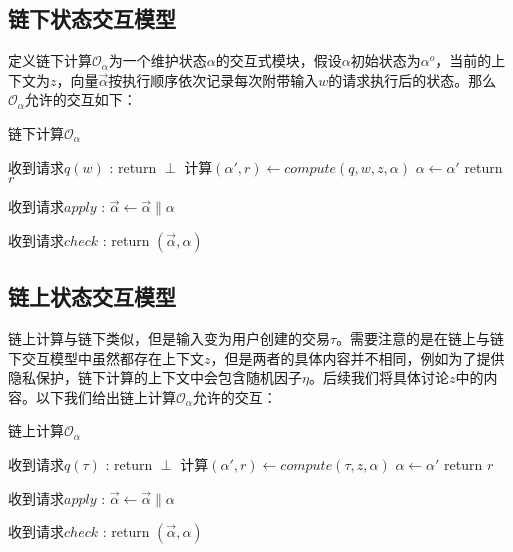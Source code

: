 \subsection{链下状态交互模型}
定义链下计算$\mathcal{O}_{\alpha}$为一个维护状态$\alpha$的交互式模块，假设$\alpha$初始状态为$\alpha^o$，当前的上下文为$z$，向量$\vec{\alpha}$按执行顺序依次记录每次附带输入$w$的请求执行后的状态。那么$\mathcal{O}_{\alpha}$允许的交互如下：

\begin{breakablealgorithm}
    \caption{链下计算$\mathcal{O}_{\alpha}$}
    \label{alg:ch3-1}
    \begin{algorithmic} 
    \item [收到请求$q(w)$]:
    \IF {$\alpha = \perp$} 
    \STATE return $\perp$
    \ENDIF
    \STATE 计算$(\alpha', r) \leftarrow compute(q, w, z, \alpha)$
    \STATE $\alpha \leftarrow \alpha'$
    \STATE return $r$
    \item [收到请求$apply$]:
    \STATE $\vec{\alpha} \leftarrow \vec{\alpha} \parallel \alpha$
    \item [收到请求$check$]:
    \STATE return $(\vec{\alpha}, \alpha)$
    \end{algorithmic}
\end{breakablealgorithm}

\subsection{链上状态交互模型}
链上计算与链下类似，但是输入变为用户创建的交易$\tau$。需要注意的是在链上与链下交互模型中虽然都存在上下文$z$，但是两者的具体内容并不相同，例如为了提供隐私保护，链下计算的上下文中会包含随机因子$\eta$。后续我们将具体讨论$z$中的内容。以下我们给出链上计算$\mathcal{O}_{\alpha}$允许的交互：

\begin{breakablealgorithm}
    \caption{链上计算$\mathcal{O}_{\alpha}$}
    \label{alg:ch3-2}
    \begin{algorithmic} 
        \setlength{\itemsep}{0pt}
        \setlength{\parsep}{0pt}
        \setlength{\parskip}{0pt}
        \item [收到请求$q(\tau)$]:
        \IF {$\alpha = \perp$}
        \STATE return $\perp$
        \ENDIF
        \STATE 计算$(\alpha', r) \leftarrow compute(\tau, z, \alpha)$
        \STATE $\alpha \leftarrow \alpha'$
        \STATE return $r$
        \item [收到请求$apply$]:
        \STATE $\vec{\alpha} \leftarrow \vec{\alpha} \parallel \alpha$
        \item [收到请求$check$]:
        \STATE return $(\vec{\alpha}, \alpha)$
    \end{algorithmic}
\end{breakablealgorithm}

